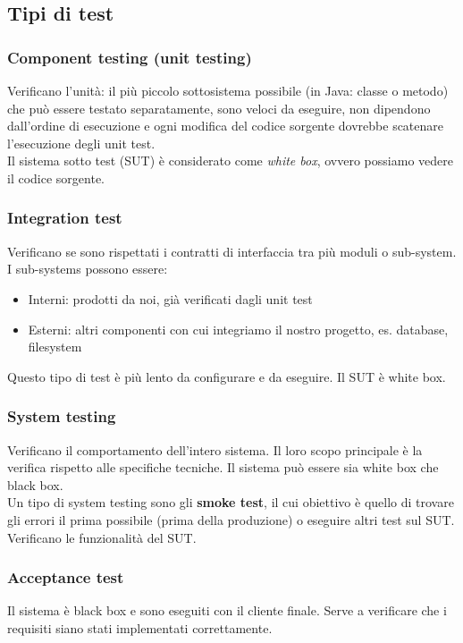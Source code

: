 \documentclass[10pt, a4paper]{article}
\begin{document}
\subsection{Tipi di test}
\subsubsection*{Component testing (unit testing)}
Verificano l’unità: il più piccolo sottosistema possibile (in Java: classe o metodo) che
può essere testato separatamente, sono veloci da eseguire, non dipendono dall'ordine di esecuzione e ogni modifica del codice sorgente dovrebbe scatenare l’esecuzione degli unit test.\\
Il sistema sotto test (SUT) è considerato come \textit{white box}, ovvero possiamo vedere il codice sorgente.

\subsubsection*{Integration test}
Verificano se sono rispettati i contratti di interfaccia tra più moduli o sub-system.\\
I sub-systems possono essere:
\begin{itemize}
    \item Interni: prodotti da noi, già verificati dagli unit test
    \item Esterni: altri componenti con cui integriamo il nostro progetto, es. database, filesystem
\end{itemize}
Questo tipo di test è più lento da configurare e da eseguire. Il SUT è white box.

\subsubsection*{System testing}
Verificano il comportamento dell'intero sistema. Il loro scopo principale è la verifica rispetto alle specifiche tecniche. Il sistema può essere sia white box che black box.\\
Un tipo di system testing sono gli \textbf{smoke test}, il cui obiettivo è quello di trovare gli errori il prima possibile (prima della produzione) o eseguire altri test sul SUT. Verificano le funzionalità del SUT.

\subsubsection*{Acceptance test}
Il sistema è black box e sono eseguiti con il cliente finale. Serve a verificare che i requisiti siano stati implementati correttamente.
\end{document}
